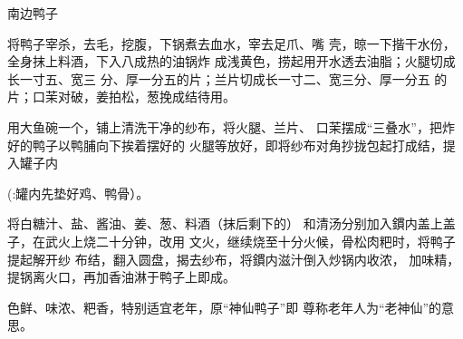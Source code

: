 \begin{recipe}[神仙鸭子]{南边鸭子}

\ingredients




\cooking

\step 	将鸭子宰杀，去毛，挖腹，下锅煮去血水，宰去足爪、嘴 壳，晾一下揩干水份，全身抹上料酒，下入八成热的油锅炸 成浅黄色，捞起用开水透去油脂；火腿切成长一寸五、宽三 分、厚一分五的片；兰片切成长一寸二、宽三分、厚一分五 的片；口茉对破，姜拍松，葱挽成结待用。

\step 	用大鱼碗一个，铺上清洗干净的纱布，将火腿、兰片、 口茉摆成“三叠水”，把炸好的鸭子以鸭脯向下挨着摆好的 火腿等放好，即将纱布对角抄拢包起打成结，提入罐子内

(:罐内先垫好鸡、鸭骨）。

\step 	将白糖汁、盐、酱油、姜、葱、料酒（抹后剩下的） 和清汤分别加入鏆内盖上盖子，在武火上烧二十分钟，改用 文火，继续烧至十分火候，骨松肉粑时，将鸭子提起解开纱 布结，翻入圆盘，揭去纱布，将鏆内滋汁倒入炒锅内收浓， 加味精，提锅离火口，再加香油淋于鸭子上即成。

\notes

色鲜、味浓、粑香，特别适宜老年，原“神仙鸭子”即 尊称老年人为“老神仙”的意思。

\end{recipe}

